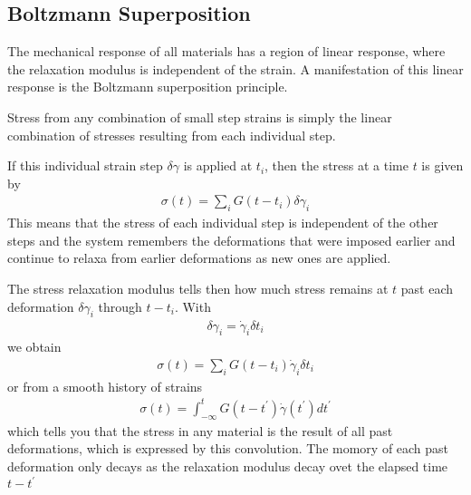 \documentclass[letterpaper,10pt,english]{sphinxmanual}
\begin{document}
\subsection{Boltzmann Superposition}
\label{\detokenize{notebooks/L24/1_Viscoelasticity:Boltzmann-Superposition}}
\sphinxAtStartPar
The mechanical response of all materials has a region of linear response, where the relaxation modulus is independent of the strain. A manifestation of this linear response is the Boltzmann superposition principle.

\sphinxAtStartPar
Stress from any combination of small step strains is simply the linear combination of stresses resulting from each individual step.

\sphinxAtStartPar
If this individual strain step \(\delta \gamma\) is applied at \(t_i\), then the stress at a time \(t\) is given by
\begin{equation*}
\begin{split}\sigma(t)=\sum_{i}G(t-t_i)\delta \gamma_i\end{split}
\end{equation*}
\sphinxAtStartPar
This means that the stress of each individual step is independent of the other steps and the system remembers the deformations that were imposed earlier and continue to relaxa from earlier deformations as new ones are applied.

\sphinxAtStartPar
The stress relaxation modulus tells then how much stress remains at \(t\) past each deformation \(\delta \gamma_i\) through \(t-t_i\). With
\begin{equation*}
\begin{split}\delta \gamma_i=\dot{\gamma}_i\delta t_i\end{split}
\end{equation*}
\sphinxAtStartPar
we obtain
\begin{equation*}
\begin{split}\sigma(t)=\sum_i G(t-t_i)\dot{\gamma}_i\delta t_i\end{split}
\end{equation*}
\sphinxAtStartPar
or from a smooth history of strains
\begin{equation*}
\begin{split}\sigma(t)=\int_{-\infty}^{t}G(t-t^{\prime})\dot{\gamma}(t^{\prime})dt^{\prime}\end{split}
\end{equation*}
\sphinxAtStartPar
which tells you that the stress in any material is the result of all past deformations, which is expressed by this convolution. The momory of each past deformation only decays as the relaxation modulus decay ovet the elapsed time \(t-t^{\prime}\)
\end{document}
